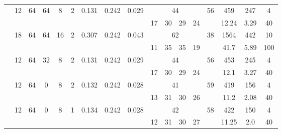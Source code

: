 \begin{landscape}
\begin{savenotes}
\begin{longtable}{ccccccccccccccccc}
\cmidrule{2-17} %

& \multirow{2}{*}{12} & \multirow{2}{*}{64} & \multirow{2}{*}{64} & \multirow{2}{*}{8} & \multirow{2}{*}{2} & \multirow{2}{*}{0.131} & \multirow{2}{*}{0.242} & \multirow{2}{*}{0.029} & \multicolumn{4}{c}{44} & \multirow{2}{*}{56} & 459 & 247 & 4 \\
\cmidrule{10-13}
 & &  &  &  &  &  &  &  & 17 & 30 & 29 & 24 &  & 12.24 & 3.29 & 40 \\


\cmidrule{2-17} %

 &\multirow{2}{*}{18} & \multirow{2}{*}{64} & \multirow{2}{*}{64} & \multirow{2}{*}{16} & \multirow{2}{*}{2} & \multirow{2}{*}{0.307} & \multirow{2}{*}{0.242} & \multirow{2}{*}{0.043} & \multicolumn{4}{c}{62} & \multirow{2}{*}{38} & 1564 & 442 & 10 \\
\cmidrule{10-13}
 & &   &  &  &  &  &  &  & 11 & 35 & 35 & 19 &  & 41.7 & 5.89 & 100 \\


\cmidrule{2-17} %

 & \multirow{2}{*}{12} & \multirow{2}{*}{64} & \multirow{2}{*}{32} & \multirow{2}{*}{8} & \multirow{2}{*}{2} & \multirow{2}{*}{0.131} & \multirow{2}{*}{0.242} & \multirow{2}{*}{0.029} & \multicolumn{4}{c}{44} & \multirow{2}{*}{56} & 453 & 245 & 4 \\
\cmidrule{10-13}
 & &  &  &  &  &  &  &  & 17 & 30 & 29 & 24 &  & 12.1 & 3.27 & 40 \\

\cmidrule{2-17} %

 & \multirow{2}{*}{12} & \multirow{2}{*}{64} & \multirow{2}{*}{0} & \multirow{2}{*}{8} & \multirow{2}{*}{2} & \multirow{2}{*}{0.132} & \multirow{2}{*}{0.242} & \multirow{2}{*}{0.028} & \multicolumn{4}{c}{41} & \multirow{2}{*}{59} & 419 & 156 & 4 \\
\cmidrule{10-13}
 &  &  &  &  &  &  &  &  & 13 & 31 & 30 & 26 &  & 11.2 & 2.08 & 40 \\

\cmidrule{2-17} %


&  \multirow{2}{*}{12} & \multirow{2}{*}{64} & \multirow{2}{*}{0} & \multirow{2}{*}{8} & \multirow{2}{*}{1} & \multirow{2}{*}{0.134} & \multirow{2}{*}{0.242} & \multirow{2}{*}{0.028} & \multicolumn{4}{c}{42} & \multirow{2}{*}{58} & 422 & 150 & 4 \\
\cmidrule{10-13}
 & &  &  &  &  &  &  &  & 12 & 31 & 30 & 27 &  & 11.25 & 2.0 & 40 \\


\end{longtable}
\end{savenotes}
\end{landscape}
